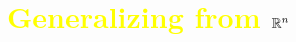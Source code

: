 \documentclass[pdf,9pt]{beamer}
\date{Chapter 6. Vector Spaces \\ \S  6-4. Finite Dimensional Spaces}
\begin{document}








\begin{frame}[fragile]
   \tableofcontents
\end{frame}
\section[\textcolor{yellow}{}]{\textcolor{yellow}{Generalizing from $\mathbb{R}^n$}}
\end{document}
